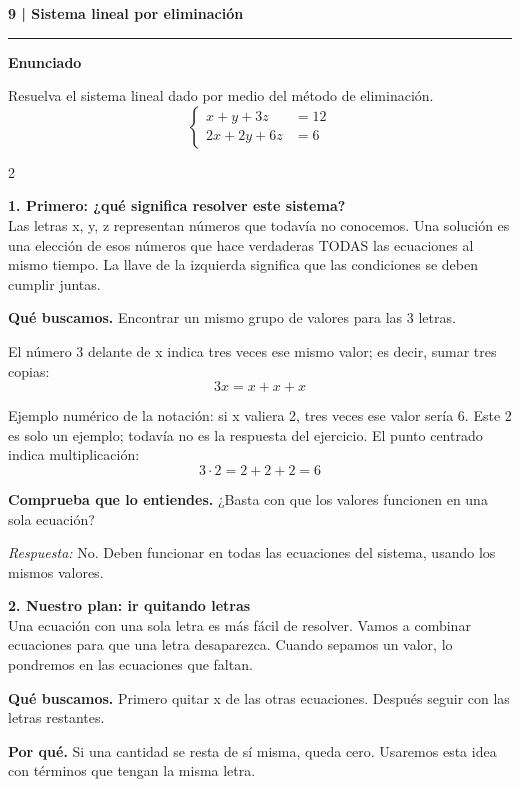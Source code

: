 \documentclass[11pt,a4paper,landscape]{article}
\newcommand{\titulo}[1]{{\LARGE\bfseries #1}\par\smallskip\hrule\medskip}
\begin{document}
\newpage{}\hypertarget{1.1-9}{}
\titulo{9 | Sistema lineal por eliminación}
\textbf{Enunciado}\par Resuelva el sistema lineal dado por medio del método de eliminación.
\[\left\{\begin{aligned}x + y + 3z &= 12\\2x + 2y + 6z &= 6\end{aligned}\right.\]
\begin{multicols*}{2}
\noindent\begin{minipage}{\linewidth}\textbf{1. Primero: ¿qué significa resolver este sistema?}\\[2pt]Las letras x, y, z representan números que todavía no conocemos. Una solución es una elección de esos números que hace verdaderas TODAS las ecuaciones al mismo tiempo. La llave de la izquierda significa que las condiciones se deben cumplir juntas.
\par\smallskip\textbf{Qué buscamos.} Encontrar un mismo grupo de valores para las 3 letras.
\par\smallskip El número 3 delante de x indica tres veces ese mismo valor; es decir, sumar tres copias:
\[3x=x+x+x\]
\par\smallskip Ejemplo numérico de la notación: si x valiera 2, tres veces ese valor sería 6. Este 2 es solo un ejemplo; todavía no es la respuesta del ejercicio. El punto centrado indica multiplicación:
\[3\cdot 2=2+2+2=6\]
\par\smallskip\textbf{Comprueba que lo entiendes.} ¿Basta con que los valores funcionen en una sola ecuación?\par\textit{Respuesta:} No. Deben funcionar en todas las ecuaciones del sistema, usando los mismos valores.
\end{minipage}\par\medskip
\noindent\begin{minipage}{\linewidth}\textbf{2. Nuestro plan: ir quitando letras}\\[2pt]Una ecuación con una sola letra es más fácil de resolver. Vamos a combinar ecuaciones para que una letra desaparezca. Cuando sepamos un valor, lo pondremos en las ecuaciones que faltan.
\par\smallskip\textbf{Qué buscamos.} Primero quitar x de las otras ecuaciones. Después seguir con las letras restantes.
\par\smallskip\textbf{Por qué.} Si una cantidad se resta de sí misma, queda cero. Usaremos esta idea con términos que tengan la misma letra.

\end{minipage}
\end{multicols*}
\end{document}
